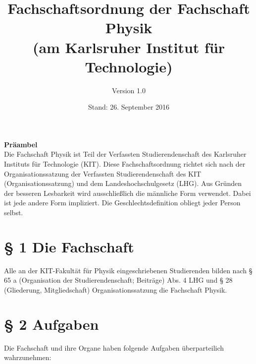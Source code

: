\documentclass[a4paper, parskip=half, numbers=noenddot]{scrartcl}
\title{Fachschaftsordnung der Fachschaft Physik\\(am Karlsruher Institut für Technologie)}
\author{Version 1.0}
\date{Stand: 26. September 2016}
\begin{document}
%
%

\maketitle
\thispagestyle{empty}
\vspace{15cm}
%
%
{\bfseries Präambel}\\
Die Fachschaft Physik ist Teil der Verfassten Studierendenschaft des Karlsruher Instituts für Technologie (KIT). Diese Fachschaftsordnung richtet sich nach der Organisationssatzung der Verfassten Studierendenschaft des KIT (Organisationssatzung) und dem Landeshochschulgesetz (LHG). Aus Gründen der besseren Lesbarkeit wird ausschließlich die männliche Form verwendet. Dabei ist jede andere Form impliziert. Die Geschlechtsdefinition obliegt jeder Person selbst.

\pagestyle{empty}
\newpage
\rule{0mm}{0mm}
\newpage



\setcounter{page}{1}
\pagestyle{plain}


%
%




%
%

\section*{§ 1 Die Fachschaft}
Alle an der KIT-Fakultät für Physik eingeschriebenen Studierenden bilden nach § 65 a (Organisation der Studierendenschaft; Beiträge) Abs. 4 LHG und § 28 (Gliederung, Mitgliedschaft) Organisationssatzung die Fachschaft Physik.


%
%

\section*{§ 2 Aufgaben}

Die Fachschaft und ihre Organe haben folgende Aufgaben überparteilich wahrzunehmen:
\end{document}
